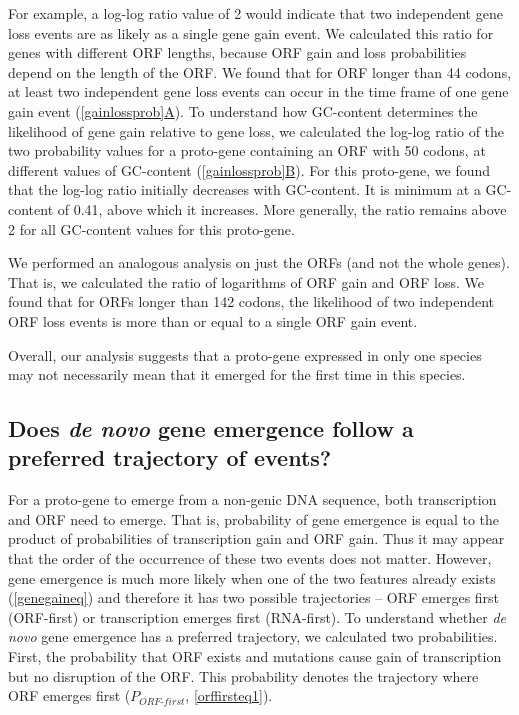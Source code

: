 \documentclass[12pt,a4paper]{article}
\begin{document}
For example, a log-log ratio value of 2 would indicate that two independent gene loss events are as likely as a single gene gain event. We calculated this ratio for genes with different ORF lengths, because ORF gain and loss probabilities depend on the length of the ORF. We found that for ORF longer than 44 codons, at least two independent gene loss events can occur in the time frame of one gene gain event (\hyperref[gainlossprob]{\autoref{gainlossprob}A}). To understand how GC-content determines the likelihood of gene gain relative to gene loss, we calculated the log-log ratio of the two probability values for a proto-gene containing an ORF with 50 codons, at different values of GC-content (\hyperref[gainlossprob]{\autoref{gainlossprob}B}). For this proto-gene, we found that the log-log ratio initially decreases with GC-content. It is minimum at a GC-content of 0.41, above which it increases. More generally, the ratio remains above 2 for all GC-content values for this proto-gene.

We performed an analogous analysis on just the ORFs (and not the whole genes). That is, we calculated the ratio of logarithms of ORF gain and ORF loss. We found that for ORFs longer than 142 codons, the likelihood of two independent ORF loss events is more than or equal to a single ORF gain event. 

Overall, our analysis suggests that a proto-gene expressed in only one species may not necessarily mean that it emerged for the first time in this species. 

\subsection{Does \textit{de novo} gene emergence follow a preferred trajectory of events?}

For a proto-gene to emerge from a non-genic DNA sequence, both transcription and ORF need to emerge. That is, probability of gene emergence is equal to the product of probabilities of transcription gain and ORF gain. Thus it may appear that the order of the occurrence of these two events does not matter. However, gene emergence is much more likely when one of the two features already exists (\autoref{genegaineq}) and therefore it has two possible trajectories -- ORF emerges first (ORF-first) or transcription emerges first (RNA-first). To understand whether \textit{de novo} gene emergence has a preferred trajectory, we calculated two probabilities. First, the probability that ORF exists and  mutations cause gain of transcription but no disruption of the ORF. This probability denotes the trajectory where ORF emerges first ($P_\textit{ORF-first}$, \autoref{orffirsteq1}). 
\end{document}

